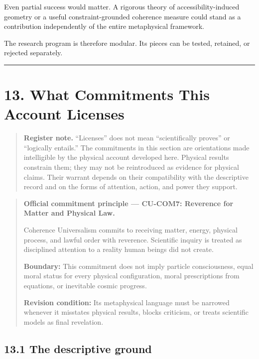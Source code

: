 \documentclass[
  11pt,
]{article}
\begin{document}
Even partial success would matter. A rigorous theory of
accessibility-induced geometry or a useful constraint-grounded coherence
measure could stand as a contribution independently of the entire
metaphysical framework.

The research program is therefore modular. Its pieces can be tested,
retained, or rejected separately.

\begin{center}\rule{0.5\linewidth}{0.5pt}\end{center}

\section{13. What Commitments This Account
Licenses}\label{what-commitments-this-account-licenses}

\begin{quote}
\textbf{Register note.} ``Licenses'' does not mean ``scientifically
proves'' or ``logically entails.'' The commitments in this section are
orientations made intelligible by the physical account developed here.
Physical results constrain them; they may not be reintroduced as
evidence for physical claims. Their warrant depends on their
compatibility with the descriptive record and on the forms of attention,
action, and power they support.
\end{quote}

\begin{quote}
\textbf{Official commitment principle --- CU-COM7: Reverence for Matter
and Physical Law.}

Coherence Universalism commits to receiving matter, energy, physical
process, and lawful order with reverence. Scientific inquiry is treated
as disciplined attention to a reality human beings did not create.

\textbf{Boundary:} This commitment does not imply particle
consciousness, equal moral status for every physical configuration,
moral prescriptions from equations, or inevitable cosmic progress.

\textbf{Revision condition:} Its metaphysical language must be narrowed
whenever it misstates physical results, blocks criticism, or treats
scientific models as final revelation.
\end{quote}

\subsection{13.1 The descriptive ground}\label{the-descriptive-ground}
\end{document}
